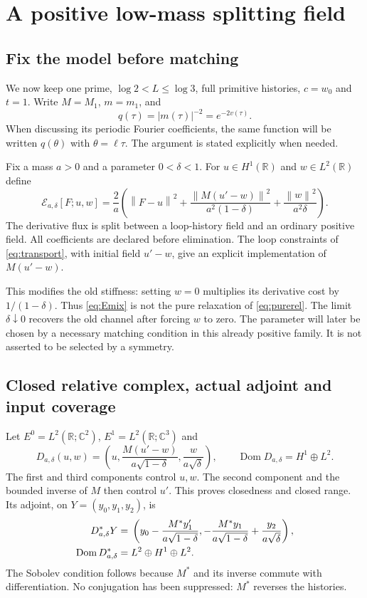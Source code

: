 \documentclass[11pt]{article}
\numberwithin{equation}{section}
\theoremstyle{definition}
\theoremstyle{remark}
\newcommand{\R}{\mathbb R}
\newcommand{\C}{\mathbb C}
\newcommand{\Dom}{\operatorname{Dom}}
\newcommand{\norm}[1]{\left\lVert#1\right\rVert}
\begin{document}
\section{A positive low-mass splitting field}
\label{sec:mixing}
\subsection{Fix the model before matching}
We now keep one prime, $\log2<L\le\log3$, full primitive histories, $c=w_0$ and $t=1$. Write $M=M_1$, $m=m_1$, and
\begin{equation}
 q(\tau)=|m(\tau)|^{-2}=e^{-2v(\tau)}.
\end{equation}
When discussing its periodic Fourier coefficients, the same function will be written $q(\theta)$ with $\theta=\ell\tau$. The argument is stated explicitly when needed.

Fix a mass $a>0$ and a parameter $0<\delta<1$. For $u\in H^1(\R)$ and $w\in L^2(\R)$ define
\begin{equation}
 \mathcal E_{a,\delta}[F;u,w]=\frac2a\left(
 \norm{F-u}^2+
 \frac{\norm{M(u'-w)}^2}{a^2(1-\delta)}+
 \frac{\norm w^2}{a^2\delta}\right).
 \label{eq:Emix}
\end{equation}
The derivative flux is split between a loop-history field and an ordinary positive field. All coefficients are declared before elimination. The loop constraints of \eqref{eq:transport}, with initial field $u'-w$, give an explicit implementation of $M(u'-w)$.

This modifies the old stiffness: setting $w=0$ multiplies its derivative cost by $1/(1-\delta)$. Thus \eqref{eq:Emix} is not the pure relaxation of \eqref{eq:purerel}. The limit $\delta\downarrow0$ recovers the old channel after forcing $w$ to zero. The parameter will later be chosen by a necessary matching condition in this already positive family. It is not asserted to be selected by a symmetry.

\subsection{Closed relative complex, actual adjoint and input coverage}
Let $E^0=L^2(\R;\C^2)$, $E^1=L^2(\R;\C^3)$ and
\begin{equation}
 D_{a,\delta}(u,w)=
 \left(u,\frac{M(u'-w)}{a\sqrt{1-\delta}},
             \frac{w}{a\sqrt\delta}\right),
 \qquad\Dom D_{a,\delta}=H^1\oplus L^2.
 \label{eq:Dmix}
\end{equation}
The first and third components control $u,w$. The second component and the bounded inverse of $M$ then control $u'$. This proves closedness and closed range. Its adjoint, on $Y=(y_0,y_1,y_2)$, is
\begin{align}
 D_{a,\delta}^*Y={}&\left(
 y_0-\frac{M^*y_1'}{a\sqrt{1-\delta}},
 -\frac{M^*y_1}{a\sqrt{1-\delta}}+\frac{y_2}{a\sqrt\delta}
 \right),\notag\\
 \Dom D_{a,\delta}^*={}&L^2\oplus H^1\oplus L^2.
 \label{eq:Dmixadj}
\end{align}
The Sobolev condition follows because $M^*$ and its inverse commute with differentiation. No conjugation has been suppressed: $M^*$ reverses the histories.
\end{document}
